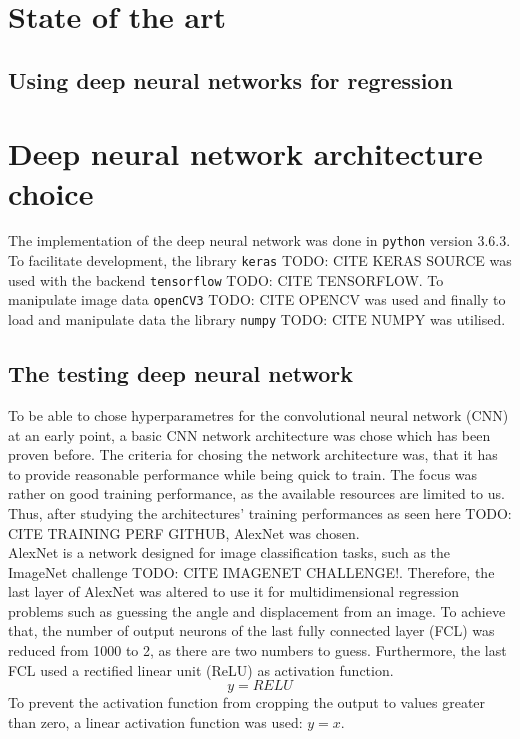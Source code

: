 \documentclass[10pt,a4paper,twoside,journal]{IEEEtran}
\begin{document}

\section{State of the art}
\label{sc:sota}
\the\textwidth

\subsection{Using deep neural networks for regression}

\section{Deep neural network architecture choice}
The implementation of the deep neural network was done in \texttt{python} version 3.6.3. To facilitate development, the library \texttt{keras} TODO: CITE KERAS SOURCE was used with the backend \texttt{tensorflow} TODO: CITE TENSORFLOW. To manipulate image data \texttt{openCV3} TODO: CITE OPENCV was used and finally to load and manipulate data the library \texttt{numpy} TODO: CITE NUMPY was utilised. 
\subsection{The testing deep neural network}
\label{ssc:testing-dnn}
To be able to chose hyperparametres for the convolutional neural network (CNN) at an early point, a basic CNN network architecture was chose which has been proven before. The criteria for chosing the network architecture was, that it has to provide reasonable performance while being quick to train. The focus was rather on good training performance, as the available resources are limited to us. Thus, after studying the architectures' training performances as seen here TODO: CITE TRAINING PERF GITHUB, AlexNet \cite{alexnet2012imagenet} was chosen.\\
AlexNet is a network designed for image classification tasks, such as the ImageNet challenge TODO: CITE IMAGENET CHALLENGE!. Therefore, the last layer of AlexNet was altered to use it for multidimensional regression problems such as guessing the angle and displacement from an image. To achieve that, the number of output neurons of the last fully connected layer (FCL) was reduced from 1000 to 2, as there are two numbers to guess. Furthermore, the last FCL used a rectified linear unit (ReLU) as activation function. 
\begin{equation}
	y = RELU
\end{equation}
To prevent the activation function from cropping the output to values greater than zero, a linear activation function was used: $ y = x $.
\end{document}
